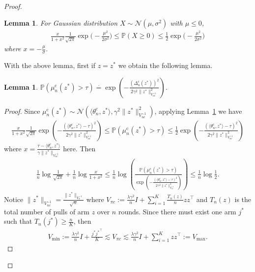 \documentclass[accepted]{uai2025} %
\theoremstyle{plain}
\newtheorem{lemma}[theorem]{Lemma}
\theoremstyle{definition}
\theoremstyle{remark}
\newcommand{\thetac}{\theta^{\mathrm{c}}}
\newcommand{\Deltac}{\Delta^{\mathrm{c}}}
\newcommand{\muc}{\mu^{\mathrm{c}}}
\newcommand{\PP}{\mathbb{P}} %
\begin{document}
\begin{proof}
\begin{lemma}
\label{lemma:gaussiancdf}
    For Gaussian distribution $X \sim \mathcal{N}(\mu, \sigma^2)$ with $\mu\le 0$,
    \begin{align*}
       \frac{x}{1+x^2}\frac{1}{\sqrt{2\pi}}\exp\Big(-\frac{\mu^2}{2\sigma^2}\Big) \le\PP(X\ge0)\le \frac{1}{2}\exp\Big(-\frac{\mu^2}{2\sigma^2}\Big)
    \end{align*}
    where $x=-\frac{ \mu}{\sigma}$.
\end{lemma}



With the above lemma, first if $z=z^*$ we obtain the following lemma.
\begin{lemma}
\label{lem:asp_1}
    $\PP(\muc_{n}(z^*)> \tau)\stackrel{\cdot}{=}\exp\left(-\frac{(\Deltac_n(z^*))^2}{2\gamma^2 \lVert z^*\rVert^2_{V^{-1}_{nc}}}\right)$.
\end{lemma}
\begin{proof}
    Since $\muc_{n}(z^*)\sim \mathcal{N}(\langle \thetac_n, z^*\rangle, \gamma^2 \lVert z^* \rVert^2_{V^{-1}_{nc}})$, applying Lemma~\ref{lemma:gaussiancdf} we have
    \begin{align*}
        \frac{x}{1+x^2}\frac{1}{\sqrt{2\pi}}\exp \left( -\frac{(\langle \thetac_n, z^*\rangle-\tau)^2}{2\gamma^2 \lVert z^* \rVert^2_{V^{-1}_{nc}}} \right)\le \PP(\muc_{n}(z^*)> \tau) \le \frac{1}{2} \exp \left( -\frac{(\langle \thetac_n, z^*\rangle-\tau)^2}{2\gamma^2 \lVert z^* \rVert^2_{V^{-1}_{nc}}} \right)
    \end{align*}
    where $x=\frac{\tau-\langle \thetac_n, z^*\rangle}{\gamma \lVert z^* \rVert_{V^{-1}_{nc}}}$ here.
    Then 
    \begin{align*}
       \frac{1}{n} \log \frac{1}{\sqrt{2\pi}} + \frac{1}{n} \log \frac{x}{1 + x^2}
 \le\frac{1}{n}\log \left(\frac{\PP(\muc_{n}(z^*)> \tau)}{\exp \left( -\frac{(\langle \thetac_n, z^*\rangle-\tau)^2}{2\gamma^2 \lVert z^* \rVert^2_{V^{-1}_{nc}}} \right)}\right)\le \frac{1}{n} \log \frac{1}{2}.
    \end{align*}
    Notice $\lVert z^*\rVert_{V_{nc}^{-1}}=\frac{\lVert z^*\rVert_{V_{\pi}^{-1}}}{\sqrt{n}}$ where $V_{\pi c}:=\frac{\lambda \gamma^2}{n} I+\sum_{i=1}^K \frac{T_{n}(z)}{n}z z^{\top}$ and $T_{n}(z)$ is the total number of pulls of arm $z$ over $n$ rounds. Since there must exist one arm $j^*$ such that $T_{n}(j^*)\ge \frac{n}{K}$, then 
\begin{align*}
   V_{\min}:=\frac{\lambda\gamma^2}{n}I+ \frac{{j^*}{j^*}^{\top}}{K}\lesssim V_{\pi c}\lesssim \frac{\lambda\gamma^2}{n}I+\sum_{i=1}^K z z^\top:=V_{\max}.

\end{align*}
\end{proof}
\end{proof}
\end{document}
